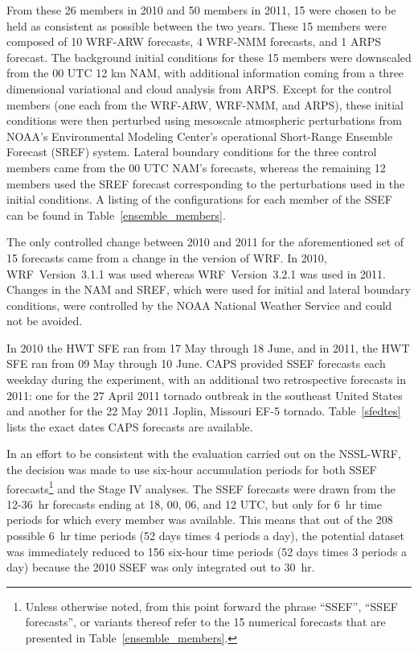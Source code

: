 From these 26 members in 2010 and 50 members in 2011, 15 were chosen to be held as consistent as possible between the two years.
These 15 members were composed of 10 WRF-ARW forecasts, 4 WRF-NMM forecasts, and 1 ARPS forecast.
The background initial conditions for these 15 members were downscaled from the 00 UTC 12 km NAM, with additional information coming from a three dimensional variational and cloud analysis from ARPS.
Except for the control members (one each from the WRF-ARW, WRF-NMM, and ARPS), these initial conditions were then perturbed using mesoscale atmospheric perturbations from NOAA's Environmental Modeling Center's operational Short-Range Ensemble Forecast (SREF) system.
Lateral boundary conditions for the three control members came from the 00 UTC NAM's forecasts, whereas the remaining 12 members used the SREF forecast corresponding to the perturbations used in the initial conditions.
A listing of the configurations for each member of the SSEF can be found in \mbox{Table \ref{ensemble_members}}.


The only controlled change between 2010 and 2011 for the aforementioned set of 15 forecasts came from a change in the version of WRF. In 2010, \mbox{WRF Version 3.1.1} was used whereas \mbox{WRF Version 3.2.1} was used in 2011.
Changes in the NAM and SREF, which were used for initial and lateral boundary conditions, were controlled by the NOAA National Weather Service and could not be avoided.


In 2010 the HWT SFE ran from 17 May through 18 June, and in 2011, the HWT SFE ran from 09  May through 10 June.
CAPS provided SSEF forecasts each weekday during the experiment, with an additional two retrospective forecasts in 2011: one for the 27 April 2011 tornado outbreak in the southeast United States and another for the 22 May 2011 Joplin, Missouri EF-5 tornado.
\mbox{Table \ref{sfedtes}} lists the exact dates CAPS forecasts are available.


In an effort to be consistent with the evaluation carried out on the NSSL-WRF, the decision was made to use six-hour accumulation periods for both SSEF forecasts\footnote{Unless otherwise noted, from this point forward the phrase ``SSEF'', ``SSEF forecasts'', or variants thereof refer to the 15 numerical forecasts that are presented in \mbox{Table \ref{ensemble_members}}.} and the Stage IV analyses.
The SSEF forecasts were drawn from the \mbox{12-36 hr} forecasts ending at 18, 00, 06, and 12 UTC, but only for \mbox{6 hr} time periods for which every member was available.
This means that out of the 208 possible \mbox{6 hr} time periods (52 days times 4 periods a day), the potential dataset was immediately reduced to 156 six-hour time periods (52 days times 3 periods a day) because the 2010 SSEF was only integrated out to \mbox{30 hr}.




